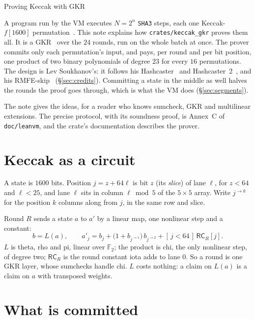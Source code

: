 \documentclass[11pt]{article}
\newcommand{\F}{\mathbb{F}_2}
\newcommand{\along}[2]{#1^{\rightarrow #2}}
\newcommand{\RC}{\mathsf{RC}}
\begin{document}
\begin{center}
{\LARGE Proving Keccak with GKR}
\end{center}
\vspace{1em}

A program run by the VM executes $N = 2^n$ \texttt{SHA3} steps, each one Keccak-$f[1600]$ permutation~\cite{fips202}. This note explains how \texttt{crates/keccak\_gkr} proves them all. It is a GKR~\cite{GKR08} over the $24$ rounds, run on the whole batch at once. The prover commits only each permutation's input, and pays, per round and per bit position, one product of two binary polynomials of degree $23$ for every $16$ permutations. The design is Lev Soukhanov's: it follows his Hashcaster~\cite{hashcaster} and Hashcaster~2~\cite{hashcaster2}, and his RMFE-skip~\cite{rmfeskip} (\S\ref{sec:credits}). Committing a state in the middle as well halves the rounds the proof goes through, which is what the VM does (\S\ref{sec:segments}).

The note gives the ideas, for a reader who knows sumcheck, GKR and multilinear extensions. The precise protocol, with its soundness proof, is Annex~C of \texttt{doc/leanvm}, and the crate's documentation describes the prover.

\section{Keccak as a circuit}

A state is $1600$ bits. Position $j = z + 64\ell$ is bit $z$ (its \emph{slice}) of lane $\ell$, for $z < 64$ and $\ell < 25$, and lane $\ell$ sits in column $\ell \bmod 5$ of the $5 \times 5$ array. Write $\along{j}{k}$ for the position $k$ columns along from $j$, in the same row and slice.

Round $R$ sends a state $a$ to $a'$ by a linear map, one nonlinear step and a constant:
\[
b = L(a), \qquad a'_j = b_j + \bigl(1 + b_{\along{j}{1}}\bigr)\, b_{\along{j}{2}} + [\,j < 64\,]\, \RC_R[j].
\]
$L$ is theta, rho and pi, linear over $\F$; the product is chi, the only nonlinear step, of degree two; $\RC_R$ is the round constant iota adds to lane $0$. So a round is one GKR layer, whose sumchecks handle chi. $L$ costs nothing: a claim on $L(a)$ is a claim on $a$ with transposed weights.

\section{What is committed}
\end{document}
